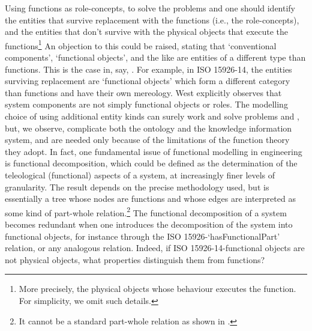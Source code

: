 \documentclass[
]{ceurart}
\begin{document}
Using functions as role-concepts, to solve the problems  and  one should identify the entities that survive replacement with the functions (i.e., the role-concepts), and the entities that don't survive with the physical objects that execute the functions\footnote{More precisely, the physical objects whose behaviour executes the function. For simplicity, we omit such details.} 
An objection to this could be raised, stating that `conventional components', `functional objects', and the like are entities of a different type than functions. This is the case in, say, \cite{westDevelopingHighQuality2011,guarinoArtefactualSystemsMissing2014,kluwerISO159261420202020}. For example, in ISO 15926-14, the entities surviving replacement are `functional objects' which form a different category than functions and have their own mereology. West \cite{westDevelopingHighQuality2011} explicitly observes that system components are not simply functional objects or roles. 
The modelling choice of using additional entity kinds can surely work and solve problems  and , but, we observe, complicate both the ontology and the knowledge information system, and are needed only because of the limitations of the function theory they adopt. 
In fact, one fundamental issue of functional modelling in engineering is functional decomposition, which could be defined as the determination of the teleological (functional) aspects of a system, at increasingly finer levels of granularity. The result depends on the precise methodology used, but is essentially a tree whose nodes are functions and whose edges are interpreted as some kind of part-whole relation.\footnote{It cannot be a standard part-whole relation as shown in \cite{vermaasFormalImpossibilityAnalysing2013}.}
The functional decomposition of a system becomes redundant when one introduces the decomposition of the system into functional objects, for instance through the ISO 15926-`hasFunctionalPart' relation, or any analogous relation. Indeed, if ISO 15926-14-functional objects are not physical objects, what properties distinguish them from functions?
\end{document}
